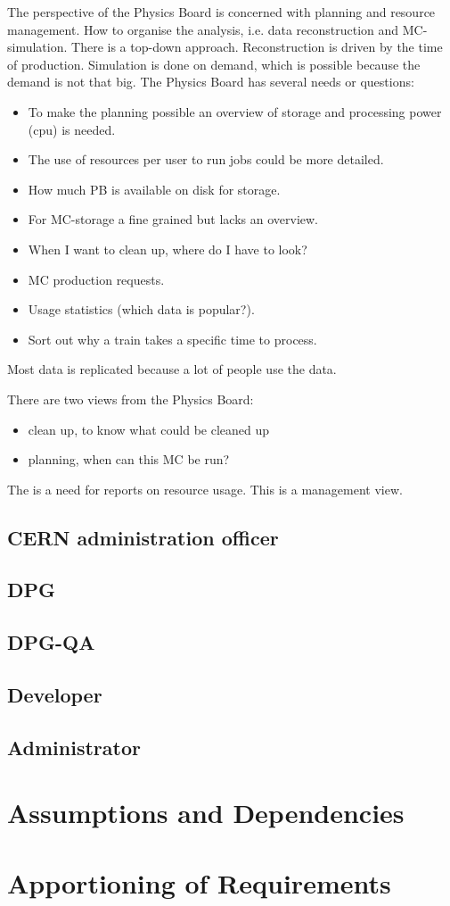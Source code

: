 The perspective of the Physics Board is concerned with planning and resource management. How to organise the analysis, i.e. data reconstruction and MC-simulation. There is a top-down approach. Reconstruction is driven by the time of production. Simulation is done on demand, which is possible because the demand is not that big. The Physics Board has several needs or questions:
\begin{itemize}
  \item To make the planning possible an overview of storage and processing power (cpu) is needed. 
  \item The use of resources per user to run jobs could be more detailed.
  \item How much PB is available on disk for storage.
  \item For MC-storage a fine grained but lacks an overview.
  \item When I want to clean up, where do I have to look?
  \item MC production requests.
  \item Usage statistics (which data is popular?).
  \item Sort out why a train takes a specific time to process.
\end{itemize}
Most data is replicated because a lot of people use the data.

There are two views from the Physics Board:
\begin{itemize}
  \item clean up, to know what could be cleaned up
  \item planning, when can this MC be run?
\end{itemize}
The is a need for reports on resource usage. This is a management view.






\subsection{CERN administration officer}

\subsection{DPG}

\subsection{DPG-QA}

\subsection{Developer}

\subsection{Administrator}



\section{Assumptions and Dependencies}
\section{Apportioning of Requirements}

